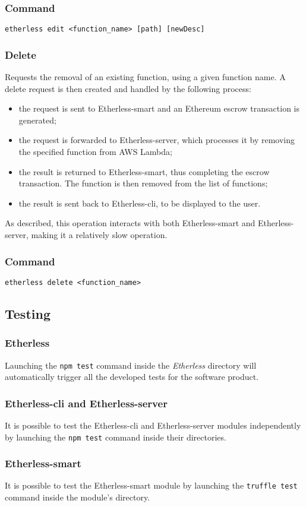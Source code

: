 	\subsubsection*{Command}
	\texttt{etherless edit <function\_name> [path] [newDesc]}
	\subsubsection{Delete}
	Requests the removal of an existing function, using a given function name. A delete request is then created and handled by the following process:
	\begin{itemize}
		\item the request is sent to Etherless-smart and an Ethereum escrow transaction is generated;
		\item the request is forwarded to Etherless-server, which processes it by removing the specified function from AWS Lambda;
		\item the result is returned to Etherless-smart, thus completing the escrow transaction. The function is then removed from the list of functions;
		\item the result is sent back to Etherless-cli, to be displayed to the user.
	\end{itemize}
	As described, this operation interacts with both Etherless-smart and Etherless-server, making it a relatively slow operation.
	\subsubsection*{Command}
	\texttt{etherless delete <function\_name>}
\subsection{Testing}
\subsubsection{Etherless}
Launching the \texttt{npm test} command inside the \textit{Etherless} directory will automatically trigger all the developed tests for the software product.
\subsubsection{Etherless-cli and Etherless-server}
It is possible to test the Etherless-cli and Etherless-server modules independently by launching the \texttt{npm test} command inside their directories.
\subsubsection{Etherless-smart}
It is possible to test the Etherless-smart module by launching the \texttt{truffle test} command inside the module's directory.
